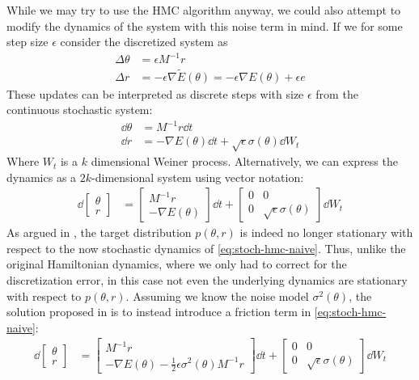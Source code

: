 While we may try to use the HMC algorithm anyway, we could also attempt to modify the dynamics of the system with this noise term in mind.
If we for some step size $\epsilon$ consider the discretized system as
\begin{align}
    \Delta \theta &=  \epsilon M^{-1} r\\
    \Delta r &=  -\epsilon\nabla{\tilde{E}}(\theta) = -\epsilon\nabla{E}(\theta)  + \epsilon e
\end{align}
These updates can be interpreted as discrete steps with size $\epsilon$ from the continuous stochastic system:
\begin{align*}
    \dd{\theta} &= M^{-1} r\dd{t} \\
    \dd{r} &= -\nabla{E}(\theta)\dd{t}  + \sqrt{\epsilon}\sigma(\theta) \dd{W_t} 
\end{align*}
Where $W_t$ is a $k$ dimensional Weiner process.
Alternatively, we can express the dynamics as a $2k$-dimensional system using vector notation:
\begin{align} \label{eq:stoch-hmc-naive}
    \dd{\begin{bmatrix}\theta \\ r \end{bmatrix}} &= 
    \begin{bmatrix}
        M^{-1}r \\ -\nabla{E}(\theta) 
    \end{bmatrix} \dd{t} + \begin{bmatrix}
        0 & 0 \\ 
        0 & \sqrt{\epsilon}\sigma(\theta)
    \end{bmatrix} \dd{W_t}
\end{align}
As argued in \cite{chen_stochastic_2014}, the target distribution $p(\theta, r)$ is indeed no longer stationary with respect to the now stochastic dynamics of \cref{eq:stoch-hmc-naive}.
Thus, unlike the original Hamiltonian dynamics, where we only had to correct for the discretization error, in this case not even the underlying dynamics are stationary with respect to $p(\theta, r)$.
Assuming we know the noise model $\sigma^2(\theta)$, the solution proposed in \cite{chen_stochastic_2014} is to instead introduce a friction term in \cref{eq:stoch-hmc-naive}:
\begin{align} \label{eq:stoch-hmc-w-friction}
    \dd{\begin{bmatrix}\theta \\ r \end{bmatrix}} &= 
    \begin{bmatrix}
        M^{-1}r \\ -\nabla{E}(\theta)-\frac{1}{2}\epsilon\sigma^2(\theta)M^{-1}r
    \end{bmatrix} \dd{t} + \begin{bmatrix}
        0 & 0 \\ 
        0 & \sqrt{\epsilon}\sigma(\theta)
    \end{bmatrix} \dd{W_t}
\end{align}
